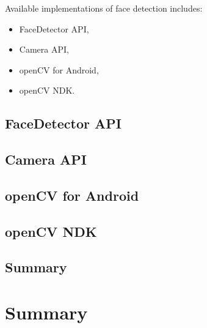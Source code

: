 \documentclass[openany]{mgr} %
\begin{document}
Available implementations of face detection includes:
\begin{itemize}
  \item FaceDetector API,
  \item Camera API,
  \item openCV for Android,
  \item openCV NDK.
\end{itemize}


\section{FaceDetector API}




\section{Camera API}



\section{openCV for Android}




\section{openCV NDK}

\section{Summary}

\chapter{Summary}
\end{document}
